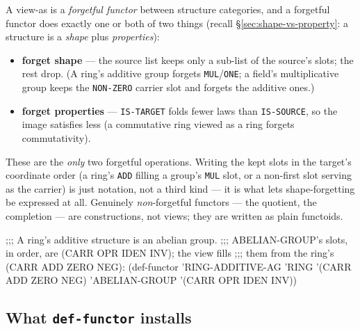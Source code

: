 A view-as is a \emph{forgetful functor} between structure categories, and a
forgetful functor does exactly one or both of two things (recall
\S\ref{sec:shape-vs-property}: a structure is a \emph{shape} plus
\emph{properties}):

\begin{itemize}
\item \textbf{forget shape} --- the source list keeps only a sub-list of the
  source's slots; the rest drop.  (A ring's additive group forgets
  \texttt{MUL}/\texttt{ONE}; a field's multiplicative group keeps the
  \texttt{NON-ZERO} carrier slot and forgets the additive ones.)
\item \textbf{forget properties} --- \texttt{IS-TARGET} folds fewer laws than
  \texttt{IS-SOURCE}, so the image satisfies less (a commutative ring viewed
  as a ring forgets commutativity).
\end{itemize}

\noindent These are the \emph{only} two forgetful operations.  Writing the kept
slots in the target's coordinate order (a ring's \texttt{ADD} filling a group's
\texttt{MUL} slot, or a non-first slot serving as the carrier) is just
notation, not a third kind --- it is what lets shape-forgetting be expressed at
all.  Genuinely \emph{non}-forgetful functors --- the quotient, the completion
--- are constructions, not views; they are written as plain functoids.

\begin{VNBcode}
;;; A ring's additive structure is an abelian group.
;;; ABELIAN-GROUP's slots, in order, are (CARR OPR IDEN INV); the view fills
;;; them from the ring's (CARR ADD ZERO NEG):
(def-functor 'RING-ADDITIVE-AG
  'RING          '(CARR ADD ZERO NEG)
  'ABELIAN-GROUP '(CARR OPR IDEN INV))
\end{VNBcode}

\subsection{What \texttt{def-functor} installs}

